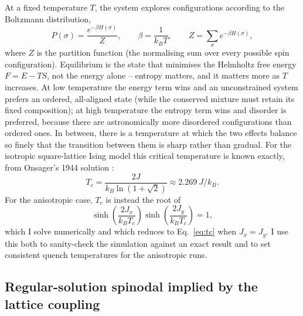 \documentclass[11pt]{article}
\begin{document}
At a fixed temperature $T$, the system explores configurations according
to the Boltzmann distribution,
\begin{equation}
P(\sigma) = \frac{e^{-\beta H(\sigma)}}{Z}, \qquad \beta = \frac{1}{k_B T}, \qquad Z = \sum_\sigma e^{-\beta H(\sigma)},
\label{eq:boltzmann}
\end{equation}
where $Z$ is the partition function (the normalising sum over every
possible spin configuration). Equilibrium is the state that minimises the
Helmholtz free energy $F = E - TS$, not the energy alone -- entropy
matters, and it matters more as $T$ increases. At low temperature the
energy term wins and an unconstrained system prefers an ordered, all-aligned
state (while the conserved mixture must retain its fixed composition); at
high temperature the entropy term wins and disorder is preferred, because
there are astronomically more disordered configurations than ordered
ones. In between, there is a temperature at which the two effects balance
so finely that the transition between them is sharp rather than gradual.
For the isotropic square-lattice Ising model this critical temperature is
known exactly, from Onsager's 1944 solution \cite{Onsager1944}:
\begin{equation}
T_c = \frac{2J}{k_B\ln(1+\sqrt2)} \approx 2.269\ J/k_B.
\label{eq:tc}
\end{equation}
For the anisotropic case, $T_c$ is instead the root of
\begin{equation}
\sinh\!\left(\frac{2J_x}{k_B T_c}\right)\sinh\!\left(\frac{2J_y}{k_B T_c}\right) = 1,
\label{eq:tc-aniso}
\end{equation}
which I solve numerically and which reduces to Eq.~\eqref{eq:tc} when
$J_x=J_y$. I use this both to sanity-check the simulation against an exact
result and to set consistent quench temperatures for the anisotropic runs.

\subsection{Regular-solution spinodal implied by the lattice coupling}
\end{document}
